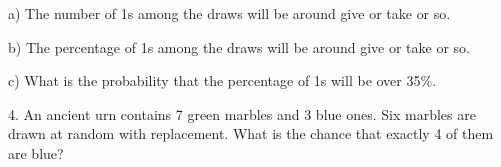 \documentclass[10pt]{article}
\begin{document}
\hspace{20pt} a) 
The number of 1s among the draws will be around \underline{\hspace{45pt}} 
give or take \underline{\hspace{45pt}}  or so.
\vspace{1.5in}

\hspace{20pt} b) 
The percentage of 1s among the draws will be around \underline{\hspace{45pt}} 
give or take \underline{\hspace{45pt}}  or so.
\vspace{1.5in}

\hspace{20pt} c) What is the probability that the percentage of 1s will 
be over 35\%.
\vspace{1.5in}

4.  An ancient urn contains 7 green marbles and 3 blue ones.  Six marbles are drawn at random with replacement.
What is the chance that exactly 4 of them are blue?


\vfill
\eject
\end{document}

